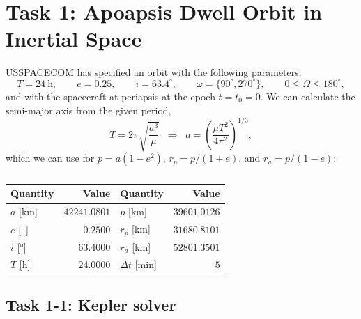 \section{Task 1: Apoapsis Dwell Orbit in Inertial Space}
\label{sec:task1}

\begin{newpar}
USSPACECOM has specified an orbit with the following parameters:
\begin{equation}
T = \SI{24}{\hour}, \qquad e = 0.25, \qquad i = 63.4^\circ, \qquad \omega = \{90^\circ, 270^\circ\}, \qquad 0 \le \Omega \le 180^\circ,
\label{eq:t1-given}
\end{equation}
and with the spacecraft at periapsis at the epoch $t=t_0=0$. We can calculate the semi-major axis from the given period,
\begin{equation}
T = 2\pi\sqrt{\frac{a^3}{\mu}} \;\;\Longrightarrow\;\; a = \left(\frac{\mu T^2}{4\pi^2}\right)^{1/3},
\end{equation}
which we can use for $p = a(1-e^2)$, $r_p = p/(1+e)$, and $r_a = p/(1-e)$:
\end{newpar}

\begin{table}[H]
\centering
\caption{}
\label{tab:t1-design}
\color{newtext}
\begin{tabular}{@{}lr@{\qquad}lr@{}}
\toprule
Quantity & Value & Quantity & Value \\
\midrule
$a$ [\si{\kilo\meter}] & $42241.0801$ & $p$ [\si{\kilo\meter}] & $39601.0126$ \\
$e$ [--] & $0.2500$ & $r_p$ [\si{\kilo\meter}] & $31680.8101$ \\
$i$ [\si{\degree}] & $63.4000$ & $r_a$ [\si{\kilo\meter}] & $52801.3501$ \\
$T$ [\si{\hour}] & $24.0000$ & $\Delta t$ [\si{\minute}] & $5$ \\
\bottomrule
\end{tabular}
\end{table}

\subsection*{Task 1-1: Kepler solver}

